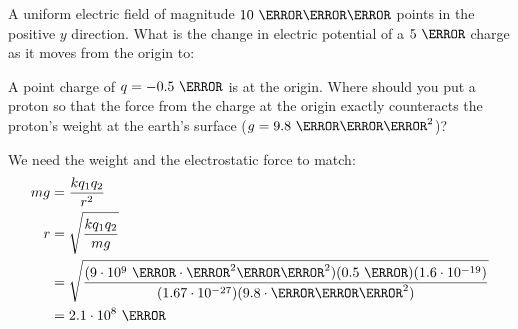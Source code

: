 \documentclass[fleqn,addpoints]{exam}
\begin{document}
\begin{questions}
\question
A uniform electric field of magnitude $10 \ \volt \per \meter$ points in the positive $y$ direction.  What is the change
in electric potential of a $5 \ \coulomb$ charge as it moves from the origin to:

\question[5]
A point charge of $q = -0.5 \ \coulomb$ is at the origin.  Where should you put a proton so that the force from the
charge at the origin exactly counteracts the proton's weight at the earth's surface ($g = 9.8 \ \meter\per\second^2$)?

\begin{solution}
We need the weight and the electrostatic force to match:
\begin{align*}
  mg &= \frac{kq_1q_2}{r^2} \\
  r  &= \sqrt{ \frac{kq_1q_2}{mg} } \\
     &= \sqrt{ \frac{ (9 \cdot 10^9 \ \newton \cdot \meter^2 \per \coulomb^2) (0.5 \ \coulomb)(1.6 \cdot 10^{-19})}
                    {(1.67 \cdot 10^{-27})(9.8 \cdot \meter \per \second^2)} } \\
     &= 2.1 \cdot 10^8 \ \meter \\
\end{align*}


\end{solution}
\end{questions}
\end{document}
